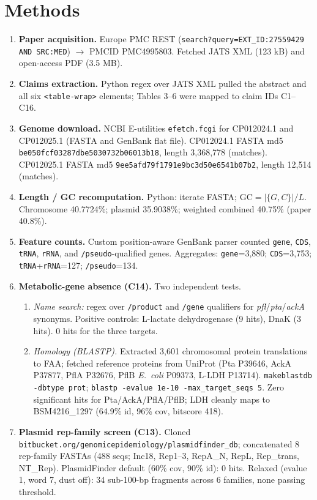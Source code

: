 \documentclass[11pt]{article}
\begin{document}
\section{Methods}

\begin{enumerate}
\item \textbf{Paper acquisition.} Europe PMC REST (\texttt{search?query=EXT\_ID:27559429 AND SRC:MED}) $\rightarrow$ PMCID PMC4995803. Fetched JATS XML (123 kB) and open-access PDF (3.5 MB).
\item \textbf{Claims extraction.} Python regex over JATS XML pulled the abstract and all six \texttt{<table-wrap>} elements; Tables 3--6 were mapped to claim IDs C1--C16.
\item \textbf{Genome download.} NCBI E-utilities \texttt{efetch.fcgi} for CP012024.1 and CP012025.1 (FASTA and GenBank flat file). CP012024.1 FASTA md5 \texttt{be050fcf03287dbe5030732b06013b18}, length 3{,}368{,}778 (matches). CP012025.1 FASTA md5 \texttt{9ee5afd79f1791e9bc3d50e6541b07b2}, length 12{,}514 (matches).
\item \textbf{Length / GC recomputation.} Python: iterate FASTA; $\mathrm{GC} = |\{G,C\}|/L$. Chromosome 40.7724\%; plasmid 35.9038\%; weighted combined 40.75\% (paper 40.8\%).
\item \textbf{Feature counts.} Custom position-aware GenBank parser counted \texttt{gene}, \texttt{CDS}, \texttt{tRNA}, \texttt{rRNA}, and \texttt{/pseudo}-qualified genes. Aggregates: \texttt{gene}=3{,}880; \texttt{CDS}=3{,}753; \texttt{tRNA}+\texttt{rRNA}=127; \texttt{/pseudo}=134.
\item \textbf{Metabolic-gene absence (C14).} Two independent tests.
  \begin{enumerate}
  \item \emph{Name search:} regex over \texttt{/product} and \texttt{/gene} qualifiers for \textit{pfl}/\textit{pta}/\textit{ackA} synonyms. Positive controls: L-lactate dehydrogenase (9 hits), DnaK (3 hits). 0 hits for the three targets.
  \item \emph{Homology (BLASTP).} Extracted 3{,}601 chromosomal protein translations to FAA; fetched reference proteins from UniProt (Pta P39646, AckA P37877, PflA P32676, PflB \textit{E.\ coli} P09373, L-LDH P13714). \texttt{makeblastdb -dbtype prot}; \texttt{blastp -evalue 1e-10 -max\_target\_seqs 5}. Zero significant hits for Pta/AckA/PflA/PflB; LDH cleanly maps to BSM4216\_1297 (64.9\% id, 96\% cov, bitscore 418).
  \end{enumerate}
\item \textbf{Plasmid rep-family screen (C13).} Cloned \texttt{bitbucket.org/genomicepidemiology/plasmidfinder\_db}; concatenated 8 rep-family FASTAs (488 seqs; Inc18, Rep1--3, RepA\_N, RepL, Rep\_trans, NT\_Rep). PlasmidFinder default (60\% cov, 90\% id): 0 hits. Relaxed (evalue 1, word 7, dust off): 34 sub-100-bp fragments across 6 families, none passing threshold.

\end{enumerate}
\end{document}
